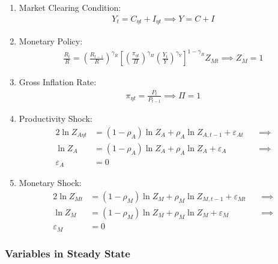 \documentclass[
	12pt,
	]{article}
\numberwithin{equation}{section}
\theoremstyle{definition}
\theoremstyle{plain}
\theoremstyle{plain}
\theoremstyle{plain}
\begin{document}
\begin{enumerate}
	\item Market Clearing Condition:
	\begin{align}
		\label{eq:ss-market-clearing-condition}
		Y_t = C_{\eta t} + I_{\eta t} \implies Y = C + I
	\end{align}
	
	\item Monetary Policy:
	\begin{align}
		\label{eq:ss-monetary-policy}
		\frac{R_t}{R} =
		\left( \frac{R_{t-1}}{R} \right)^{\gamma_R}  \left[
		\left( \frac{\pi_{\eta t}}{\Pi} \right)^{\gamma_\Pi}
		\left( \frac{Y_t}{Y} \right)^{\gamma_Y} \right]^{1-\gamma_R} Z_{Mt}
		\implies Z_{M} = 1
	\end{align}
	
	\item Gross Inflation Rate:
	\begin{align}
		\label{eq:ss-gross-inflation-rate}
		\pi_{\eta t} = \frac{P_t}{P_{t-1}} \implies \Pi = 1
	\end{align}
	
	\item Productivity Shock:
	\begin{alignat}{2}
		\ln{Z_{A\eta t}} &= (1-\rho_A)\ln{Z_A} + \rho_A\ln{Z_{A,t-1}} + \varepsilon_{At} \quad &\implies \nonumber \\
		\ln{Z_{A}} &= (1-\rho_A)\ln{Z_A} + \rho_A\ln{Z_{A}} + \varepsilon_{A} &\implies \nonumber \\
		\varepsilon_{A} &= 0 \label{eq:ss-productivity-shock}
	\end{alignat}
	
	\item Monetary Shock:
	\begin{alignat}{2}
		\ln{Z_{Mt}} &= (1-\rho_M)\ln{Z_{M}} + \rho_M\ln{Z_{M,t-1}} + \varepsilon_{Mt} \quad &\implies \nonumber \\
		\ln{Z_{M}} &= (1-\rho_M)\ln{Z_{M}} + \rho_M\ln{Z_{M}} + \varepsilon_{M} &\implies \nonumber \\
		\varepsilon_{M} &= 0 \label{eq:ss-monetary-shock}
	\end{alignat}
	
\end{enumerate}


\subsubsection{Variables in Steady State}
\end{document}
